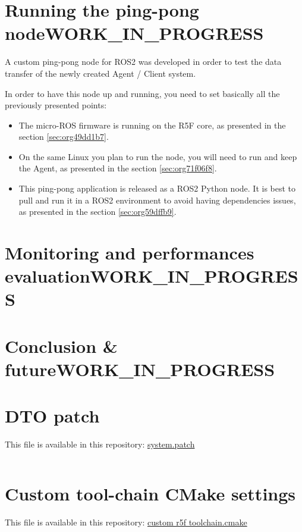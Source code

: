 \documentclass[10pt]{article}
\begin{document}
\pagebreak

\section{Running the ping-pong node\hfill{}\textsc{WORK\_IN\_PROGRESS}}
\label{sec:orgac79a01}
A custom ping-pong node for ROS2 was developed in order to test the data transfer of the newly created
Agent / Client system.

In order to have this node up and running, you need to set basically all the previously presented points:
\begin{itemize}
\item The micro-ROS firmware is running on the R5F core, as presented in the section \ref{sec:org49dd1b7}.
\item On the same Linux you plan to run the node, you will need to run and keep the Agent, as presented
in the section \ref{sec:org71f06f8}.
\item This ping-pong application is released as a ROS2 Python node. It is best to pull and run it
in a ROS2 environment to avoid having dependencies issues, as presented in the section \ref{sec:org59dffb9}.
\end{itemize}

\section{Monitoring and performances evaluation\hfill{}\textsc{WORK\_IN\_PROGRESS}}
\label{sec:org95ca788}

\section{Conclusion \& future\hfill{}\textsc{WORK\_IN\_PROGRESS}}
\label{sec:org78e5729}


\pagebreak
\appendix
\section{DTO patch}
\label{sec:org2d5acce}
This file is available in this repository: \href{https://gitlab.com/sunoc/xilinx-kria-kv260-documentation/-/blob/b7300116e153f4b5a1542f8804e4646db8030033/src/system.patch}{system.patch}
\inputminted[linenos, frame=single]{diff}{./src/system.patch}

\pagebreak
\section{Custom tool-chain CMake settings}
\label{sec:org0b6f01e}
This file is available in this repository: \href{https://gitlab.com/sunoc/xilinx-kria-kv260-documentation/-/blob/b7300116e153f4b5a1542f8804e4646db8030033/src/custom\_r5f\_toolchain.cmake}{custom r5f toolchain.cmake}
\inputminted[linenos, frame=single]{cmake}{./src/custom_r5f_toolchain.cmake}
\end{document}
